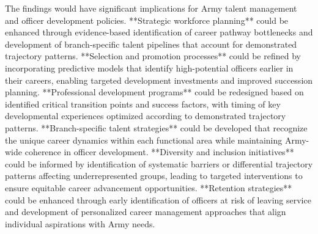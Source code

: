 \documentclass[main.tex]{subfiles}
\begin{document}

The findings would have significant implications for Army talent management and officer development policies. **Strategic workforce planning** could be enhanced through evidence-based identification of career pathway bottlenecks and development of branch-specific talent pipelines that account for demonstrated trajectory patterns. **Selection and promotion processes** could be refined by incorporating predictive models that identify high-potential officers earlier in their careers, enabling targeted development investments and improved succession planning. **Professional development programs** could be redesigned based on identified critical transition points and success factors, with timing of key developmental experiences optimized according to demonstrated trajectory patterns. **Branch-specific talent strategies** could be developed that recognize the unique career dynamics within each functional area while maintaining Army-wide coherence in officer development. **Diversity and inclusion initiatives** could be informed by identification of systematic barriers or differential trajectory patterns affecting underrepresented groups, leading to targeted interventions to ensure equitable career advancement opportunities. **Retention strategies** could be enhanced through early identification of officers at risk of leaving service and development of personalized career management approaches that align individual aspirations with Army needs.
\end{document}
